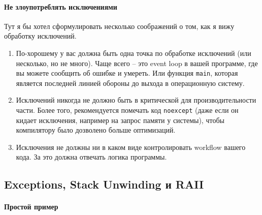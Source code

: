 \paragraph{Не злоупотреблять исключениями}

Тут я бы хотел сформулировать несколько соображений о том, как я вижу обработку исключений.
\begin{enumerate}
\item По-хорошему у вас должна быть одна точка по обработке исключений (или несколько, но не много).
Чаще всего -- это event loop в вашей программе, где вы можете сообщить об ошибке и умереть.
Или функция \verb"main", которая является последней линией обороны до выхода в операционную систему.

\item Исключений никогда не должно быть в критической для производительности части.
Более того, рекомендуется помечать код \verb"noexcept" (даже если он кидает исключения, например на запрос памяти у системы), чтобы компилятору было дозволено больше оптимизаций.

\item Исключения не должны ни в каком виде контролировать workflow вашего кода.
За это должна отвечать логика программы.
\end{enumerate}

\subsection{Exceptions, Stack Unwinding и RAII}

\paragraph{Простой пример}

